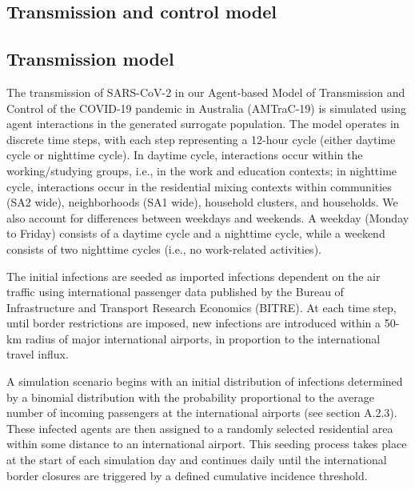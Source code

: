 \documentclass{article}
\begin{document}
\begin{appendices}
\clearpage
\section{Transmission and control model}
\label{sec_supp:model}
\subsection{Transmission model}
The transmission of SARS-CoV-2 in our Agent-based Model of Transmission and Control of the COVID-19 pandemic in Australia (AMTraC-19) is simulated using agent interactions in the generated surrogate population.  
The model operates in discrete time steps, with each step representing a 12-hour cycle (either daytime cycle or nighttime cycle).  In daytime cycle, interactions occur within the working/studying groups, i.e., in the work and education contexts; in nighttime cycle, interactions occur in the residential mixing contexts within communities (SA2 wide), neighborhoods (SA1 wide), household clusters, and households. We also account for differences between weekdays and weekends. A weekday (Monday to Friday) consists of a daytime cycle and a nighttime cycle, while a weekend consists of two nighttime cycles (i.e., no work-related activities). 

The initial infections are seeded as imported infections dependent on the air traffic using international passenger data published by the Bureau of Infrastructure and Transport Research Economics (BITRE). At each time step, until border restrictions are imposed, new infections are introduced  within a 50-km radius of major international airports, in proportion to the international travel influx.

A simulation scenario begins with an initial distribution of infections determined by a binomial distribution with the probability proportional to the average number of incoming passengers at the international airports (see section A.2.3). These infected agents are then assigned to a randomly selected residential area within some distance to an international airport. %
This seeding process takes place at the start of each simulation day and continues daily until the international border closures are triggered by a defined cumulative incidence threshold.



\end{appendices}
\end{document}

